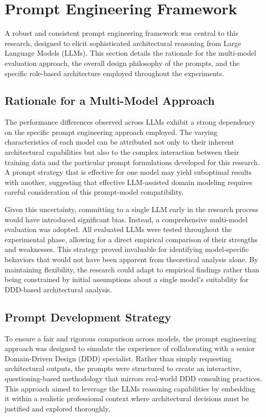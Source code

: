 \section{Prompt Engineering Framework}
A robust and consistent prompt engineering framework was central to this research, designed to elicit sophisticated architectural reasoning from Large Language Models (LLMs). This section details the rationale for the multi-model evaluation approach, the overall design philosophy of the prompts, and the specific role-based architecture employed throughout the experiments.

\subsection{Rationale for a Multi-Model Approach}
The performance differences observed across LLMs exhibit a strong dependency on the specific prompt engineering approach employed. The varying characteristics of each model can be attributed not only to their inherent architectural capabilities but also to the complex interaction between their training data and the particular prompt formulations developed for this research. A prompt strategy that is effective for one model may yield suboptimal results with another, suggesting that effective LLM-assisted domain modeling requires careful consideration of this prompt-model compatibility.

Given this uncertainty, committing to a single LLM early in the research process would have introduced significant bias. Instead, a comprehensive multi-model evaluation was adopted. All evaluated LLMs were tested throughout the experimental phase, allowing for a direct empirical comparison of their strengths and weaknesses. This strategy proved invaluable for identifying model-specific behaviors that would not have been apparent from theoretical analysis alone. By maintaining flexibility, the research could adapt to empirical findings rather than being constrained by initial assumptions about a single model's suitability for DDD-based architectural analysis.

\subsection{Prompt Development Strategy}
To ensure a fair and rigorous comparison across models, the prompt engineering approach was designed to simulate the experience of collaborating with a senior Domain-Driven Design (DDD) specialist. Rather than simply requesting architectural outputs, the prompts were structured to create an interactive, questioning-based methodology that mirrors real-world DDD consulting practices. This approach aimed to leverage the LLMs reasoning capabilities by embedding it within a realistic professional context where architectural decisions must be justified and explored thoroughly.

